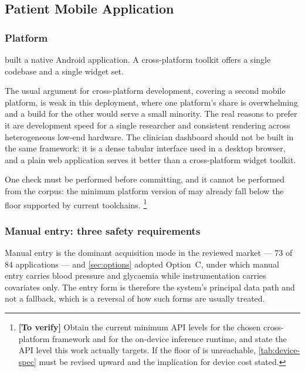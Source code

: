 \documentclass[12pt,a4paper,oneside]{report}
\newcommand{\verify}[1]{\footnote{\textbf{[To verify]} #1}}
\begin{document}
\subsection{Patient Mobile Application}\label{sec:patient-app}

\subsubsection{Platform}\label{sec:platform}

\Textcite{efendi2025} built a native Android application. A cross-platform toolkit offers a single codebase and a single widget set.

The usual argument for cross-platform development, covering a second mobile platform, is weak in this deployment, where one platform's share is overwhelming and a build for the other would serve a small minority. The real reasons to prefer it are development speed for a single researcher and consistent rendering across heterogeneous low-end hardware. The clinician dashboard should not be built in the same framework: it is a dense tabular interface used in a desktop browser, and a plain web application serves it better than a cross-platform widget toolkit.

One check must be performed before committing, and it cannot be performed from the corpus: the minimum platform version of \textcite{efendi2025} may already fall below the floor supported by current toolchains.%
\verify{Obtain the current minimum API levels for the chosen cross-platform framework and for the on-device inference runtime, and state the API level this work actually targets. If the floor of \textcite{efendi2025} is unreachable, \cref{tab:device-spec} must be revised upward and the implication for device cost stated.}

\subsubsection{Manual entry: three safety requirements}\label{sec:manual-entry}

Manual entry is the dominant acquisition mode in the reviewed market --- 73 of 84 applications --- and \cref{sec:options} adopted Option~C, under which manual entry carries blood pressure and glycaemia while instrumentation carries covariates only. The entry form is therefore the system's principal data path and not a fallback, which is a reversal of how such forms are usually treated.
\end{document}
